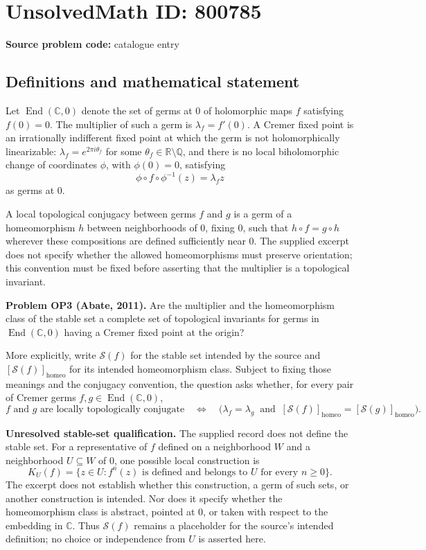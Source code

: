 \documentclass[11pt]{article}
\newcommand{\Q}{\mathbb{Q}}
\newcommand{\R}{\mathbb{R}}
\newcommand{\C}{\mathbb{C}}
\begin{document}
\section*{UnsolvedMath ID: 800785}
\textbf{Source problem code:} catalogue entry
\subsection{Definitions and mathematical statement}
Let \(\operatorname{End}(\C,0)\) denote the set of germs at \(0\) of holomorphic maps \(f\) satisfying \(f(0)=0\). The multiplier of such a germ is \(\lambda_f=f'(0)\). A Cremer fixed point is an irrationally indifferent fixed point at which the germ is not holomorphically linearizable: \(\lambda_f=e^{2\pi i\theta_f}\) for some \(\theta_f\in\R\setminus\Q\), and there is no local biholomorphic change of coordinates \(\phi\), with \(\phi(0)=0\), satisfying
\[
\phi\circ f\circ\phi^{-1}(z)=\lambda_f z
\]
as germs at \(0\).

A local topological conjugacy between germs \(f\) and \(g\) is a germ of a homeomorphism \(h\) between neighborhoods of \(0\), fixing \(0\), such that \(h\circ f=g\circ h\) wherever these compositions are defined sufficiently near \(0\). The supplied excerpt does not specify whether the allowed homeomorphisms must preserve orientation; this convention must be fixed before asserting that the multiplier is a topological invariant.

\textbf{Problem OP3 (Abate, 2011).} Are the multiplier and the homeomorphism class of the stable set a complete set of topological invariants for germs in \(\operatorname{End}(\C,0)\) having a Cremer fixed point at the origin?

More explicitly, write \(\mathcal S(f)\) for the stable set intended by the source and \([\mathcal S(f)]_{\mathrm{homeo}}\) for its intended homeomorphism class. Subject to fixing those meanings and the conjugacy convention, the question asks whether, for every pair of Cremer germs \(f,g\in\operatorname{End}(\C,0)\),
\[
f\text{ and }g\text{ are locally topologically conjugate}
\quad\Longleftrightarrow\quad
\bigl(\lambda_f=\lambda_g\ \text{ and }\ [\mathcal S(f)]_{\mathrm{homeo}}=[\mathcal S(g)]_{\mathrm{homeo}}\bigr).
\]

\textbf{Unresolved stable-set qualification.} The supplied record does not define the stable set. For a representative of \(f\) defined on a neighborhood \(W\) and a neighborhood \(U\subseteq W\) of \(0\), one possible local construction is
\[
K_U(f)=\{z\in U: f^n(z)\text{ is defined and belongs to }U\text{ for every }n\geq 0\}.
\]
The excerpt does not establish whether this construction, a germ of such sets, or another construction is intended. Nor does it specify whether the homeomorphism class is abstract, pointed at \(0\), or taken with respect to the embedding in \(\C\). Thus \(\mathcal S(f)\) remains a placeholder for the source's intended definition; no choice or independence from \(U\) is asserted here.
\end{document}
